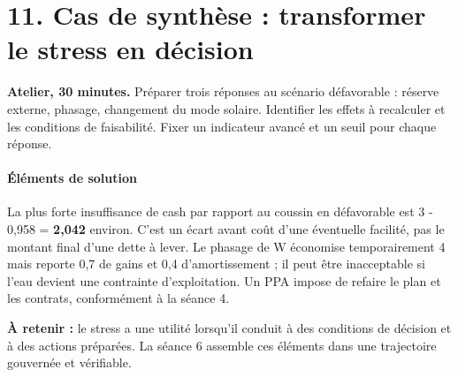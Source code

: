\documentclass[12pt,a4paper]{article}
\begin{document}
\section*{11. Cas de synthèse : transformer le stress en décision}
\textbf{Atelier, 30 minutes.} Préparer trois réponses au scénario défavorable : réserve externe, phasage, changement du mode solaire. Identifier les effets à recalculer et les conditions de faisabilité. Fixer un indicateur avancé et un seuil pour chaque réponse.



\paragraph{Éléments de solution}
La plus forte insuffisance de cash par rapport au coussin en défavorable est 3 - 0,958 = \textbf{2,042} environ. C’est un écart avant coût d’une éventuelle facilité, pas le montant final d’une dette à lever. Le phasage de W économise temporairement 4 mais reporte 0,7 de gains et 0,4 d’amortissement ; il peut être inacceptable si l’eau devient une contrainte d’exploitation. Un PPA impose de refaire le plan et les contrats, conformément à la séance 4.


\textbf{À retenir :} le stress a une utilité lorsqu’il conduit à des conditions de décision et à des actions préparées. La séance 6 assemble ces éléments dans une trajectoire gouvernée et vérifiable.
\end{document}
